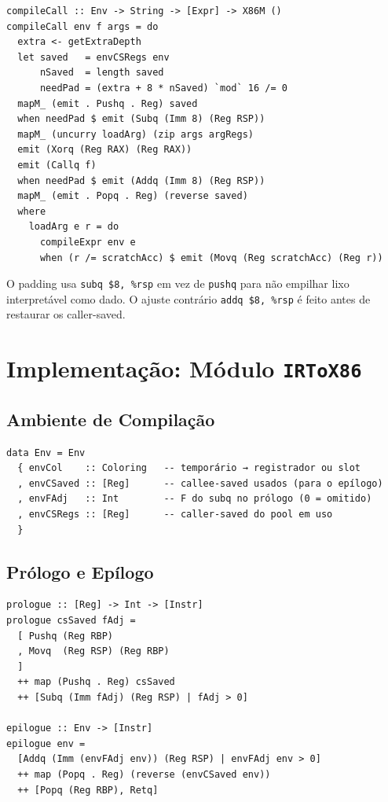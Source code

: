 \begin{verbatim}
compileCall :: Env -> String -> [Expr] -> X86M ()
compileCall env f args = do
  extra <- getExtraDepth
  let saved   = envCSRegs env
      nSaved  = length saved
      needPad = (extra + 8 * nSaved) `mod` 16 /= 0
  mapM_ (emit . Pushq . Reg) saved
  when needPad $ emit (Subq (Imm 8) (Reg RSP))
  mapM_ (uncurry loadArg) (zip args argRegs)
  emit (Xorq (Reg RAX) (Reg RAX))
  emit (Callq f)
  when needPad $ emit (Addq (Imm 8) (Reg RSP))
  mapM_ (emit . Popq . Reg) (reverse saved)
  where
    loadArg e r = do
      compileExpr env e
      when (r /= scratchAcc) $ emit (Movq (Reg scratchAcc) (Reg r))
\end{verbatim}

\begin{remark}
  O padding usa \texttt{subq \$8, \%rsp} em vez de \texttt{pushq} para
  não empilhar lixo interpretável como dado. O ajuste contrário
  \texttt{addq \$8, \%rsp} é feito antes de restaurar os caller-saved.
\end{remark}

\section{Implementação: Módulo \texttt{IRToX86}}

\subsection{Ambiente de Compilação}

\begin{verbatim}
data Env = Env
  { envCol    :: Coloring   -- temporário → registrador ou slot
  , envCSaved :: [Reg]      -- callee-saved usados (para o epílogo)
  , envFAdj   :: Int        -- F do subq no prólogo (0 = omitido)
  , envCSRegs :: [Reg]      -- caller-saved do pool em uso
  }
\end{verbatim}

\subsection{Prólogo e Epílogo}

\begin{verbatim}
prologue :: [Reg] -> Int -> [Instr]
prologue csSaved fAdj =
  [ Pushq (Reg RBP)
  , Movq  (Reg RSP) (Reg RBP)
  ]
  ++ map (Pushq . Reg) csSaved
  ++ [Subq (Imm fAdj) (Reg RSP) | fAdj > 0]

epilogue :: Env -> [Instr]
epilogue env =
  [Addq (Imm (envFAdj env)) (Reg RSP) | envFAdj env > 0]
  ++ map (Popq . Reg) (reverse (envCSaved env))
  ++ [Popq (Reg RBP), Retq]
\end{verbatim}

